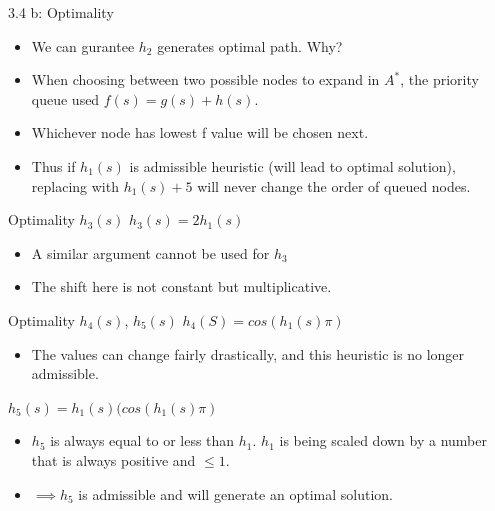 \documentclass[11pt]{beamer}
\begin{document}
\begin{frame}{3.4 b: Optimality}
\begin{itemize}
	\item We can gurantee $h_2$ generates optimal path. Why?\pause
	\item When choosing between two possible nodes to expand in $A^*$, the priority queue used $f(s)= g(s) + h(s)$. \pause
	\item Whichever node has lowest f value will be chosen next. \pause 
	\item Thus if $h_1(s)$ is admissible heuristic (will lead to optimal solution), replacing with $h_1(s)+5$ will never change the order of queued nodes.
\end{itemize}
\end{frame}

\begin{frame}{Optimality $h_3(s)$}
$h_3(s) = 2h_1(s)$
\pause
\begin{itemize}
	\item A similar argument cannot be used for $h_3$\pause
	\item The shift here is not constant but multiplicative.
\end{itemize}
\end{frame}

\begin{frame}{Optimality $h_4(s)$, $h_5(s)$}
\pause
$h_4(S) = cos(h_1(s)\pi)$
\begin{itemize}
	\item The values can change fairly drastically, and this heuristic is no longer admissible.
\end{itemize}
\pause
$h_5(s)= h_1(s)(cos(h_1(s)\pi)$\pause
\begin{itemize}
	\item $h_5$ is always equal to or less than $h_1$. $h_1$ is being scaled down by a number that is always positive and $\leq 1$. \\
	\item $\implies h_5$ is admissible and will generate an optimal solution. 
\end{itemize}
\end{frame}
\end{document}
